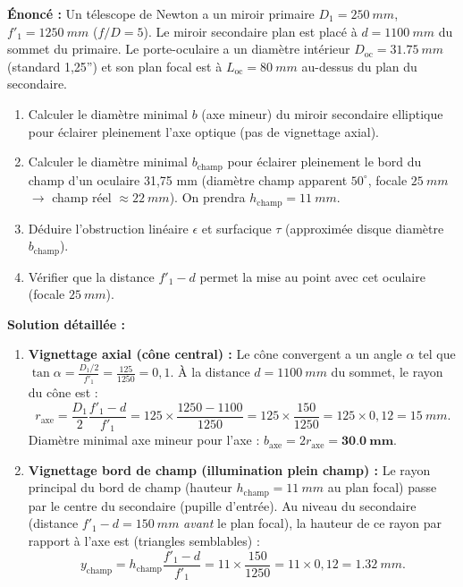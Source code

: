 \documentclass[11pt]{article}
\begin{document}
\begin{exoresolu}
\textbf{Énoncé :} Un télescope de Newton a un miroir primaire $D_1 = \SI{250}{mm}$, $f'_1 = \SI{1250}{mm}$ ($f/D=5$). Le miroir secondaire plan est placé à $d = \SI{1100}{mm}$ du sommet du primaire. Le porte-oculaire a un diamètre intérieur $D_{\text{oc}} = \SI{31,75}{mm}$ (standard 1,25'') et son plan focal est à $L_{\text{oc}} = \SI{80}{mm}$ au-dessus du plan du secondaire.
\begin{enumerate}
    \item Calculer le diamètre minimal $b$ (axe mineur) du miroir secondaire elliptique pour éclairer pleinement l'axe optique (pas de vignettage axial).
    \item Calculer le diamètre minimal $b_{\text{champ}}$ pour éclairer pleinement le bord du champ d'un oculaire 31,75 mm (diamètre champ apparent $50^\circ$, focale $\SI{25}{mm}$ $\rightarrow$ champ réel $\approx \SI{22}{mm}$). On prendra $h_{\text{champ}} = \SI{11}{mm}$.
    \item Déduire l'obstruction linéaire $\epsilon$ et surfacique $\tau$ (approximée disque diamètre $b_{\text{champ}}$).
    \item Vérifier que la distance $f'_1 - d$ permet la mise au point avec cet oculaire (focale $\SI{25}{mm}$).
\end{enumerate}
\tcblower\textbf{Solution détaillée :}
\begin{enumerate}
    \item \textbf{Vignettage axial (cône central) :}
    Le cône convergent a un angle $\alpha$ tel que $\tan\alpha = \frac{D_1/2}{f'_1} = \frac{125}{1250} = 0,1$.
    À la distance $d = \SI{1100}{mm}$ du sommet, le rayon du cône est :
    \[
    r_{\text{axe}} = \frac{D_1}{2} \frac{f'_1 - d}{f'_1} = 125 \times \frac{1250 - 1100}{1250} = 125 \times \frac{150}{1250} = 125 \times 0,12 = \SI{15}{mm}.
    \]
    Diamètre minimal axe mineur pour l'axe : $b_{\text{axe}} = 2 r_{\text{axe}} = \mathbf{\SI{30,0}{mm}}$.
    \item \textbf{Vignettage bord de champ (illumination plein champ) :}
    Le rayon principal du bord de champ (hauteur $h_{\text{champ}} = \SI{11}{mm}$ au plan focal) passe par le centre du secondaire (pupille d'entrée).
    Au niveau du secondaire (distance $f'_1 - d = \SI{150}{mm}$ \emph{avant} le plan focal), la hauteur de ce rayon par rapport à l'axe est (triangles semblables) :
    \[
    y_{\text{champ}} = h_{\text{champ}} \frac{f'_1 - d}{f'_1} = 11 \times \frac{150}{1250} = 11 \times 0,12 = \SI{1,32}{mm}.
\]
\end{enumerate}
\end{exoresolu}
\end{document}
